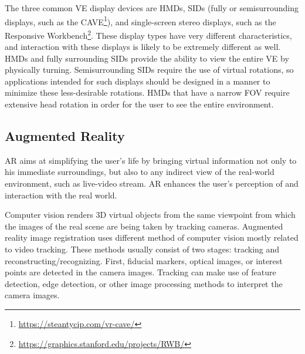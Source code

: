 The three common \gls{VE} display devices are \glspl{HMD}, \glspl{SID} (fully or 
semisurrounding displays, such as the \gls{CAVE}\footnote{\url{https://steantycip.com/vr-cave/}}), and single-screen stereo displays, such as the Responsive Workbench\footnote{\url{https://graphics.stanford.edu/projects/RWB/}}. 
These display types have very different characteristics, and interaction with these displays is likely to be extremely different as well. HMDs and fully surrounding \glspl{SID} provide the ability to view the entire \gls{VE} by physically turning. Semisurrounding \glspl{SID} require the use of virtual rotations, so applications intended for such 
displays should be designed in a manner to minimize these less-desirable rotations. \glspl{HMD} that have a narrow \gls{FOV} require extensive head rotation in order for the user to see the entire environment. 



\subsection{Augmented Reality}
\label{sec:augmented_reality}

\gls{AR} aims at simplifying the user’s life by bringing virtual information not
only to his immediate surroundings, but also to any indirect view of the real-world
environment, such as live-video stream. \gls{AR} enhances the user’s perception of and
interaction with the real world. 

Computer vision renders \gls{3D} virtual objects from the same viewpoint from which the
images of the real scene are being taken by tracking cameras. Augmented reality image
registration uses different method of computer vision mostly related to video tracking.
These methods usually consist of two stages: tracking and reconstructing/recognizing. First,
fiducial markers, optical images, or interest points are detected in the camera images.
Tracking can make use of feature detection, edge detection, or other image processing
methods to interpret the camera images.

